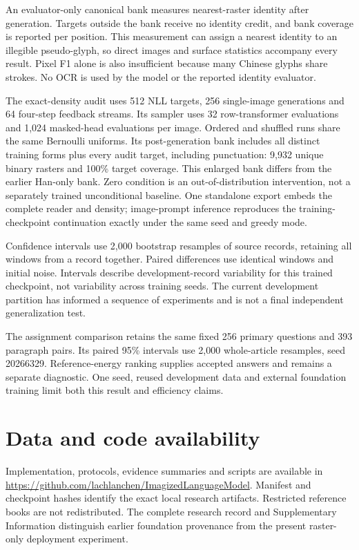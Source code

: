 An evaluator-only canonical bank measures nearest-raster identity after
generation. Targets outside the bank receive no identity credit, and bank
coverage is reported per position. This measurement can assign a nearest
identity to an illegible pseudo-glyph, so direct images and surface statistics
accompany every result. Pixel F1 alone is also insufficient because many
Chinese glyphs share strokes. No OCR is used by the model or the reported
identity evaluator.

The exact-density audit uses 512 NLL targets, 256 single-image generations and
64 four-step feedback streams. Its sampler uses 32 row-transformer evaluations
and 1,024 masked-head evaluations per image. Ordered and shuffled runs share
the same Bernoulli uniforms. Its post-generation bank includes all distinct
training forms plus every audit target, including punctuation: 9,932 unique
binary rasters and 100\% target coverage. This enlarged bank differs from the
earlier Han-only bank. Zero condition is an out-of-distribution intervention,
not a separately trained unconditional baseline. One standalone export embeds
the complete reader and density; image-prompt inference reproduces the
training-checkpoint continuation exactly under the same seed and greedy mode.

Confidence intervals use 2,000 bootstrap resamples of source records, retaining
all windows from a record together. Paired differences use identical windows
and initial noise. Intervals describe development-record variability for this
trained checkpoint, not variability across training seeds. The current
development partition has informed a sequence of experiments and is not a
final independent generalization test.

The assignment comparison retains the same fixed 256 primary questions and
393 paragraph pairs. Its paired 95\% intervals use 2,000 whole-article
resamples, seed 20266329. Reference-energy ranking supplies accepted answers
and remains a separate diagnostic. One seed, reused development data and
external foundation training limit both this result and efficiency claims.

\relax %
\section*{Data and code availability}
Implementation, protocols, evidence summaries and scripts are available in
\url{https://github.com/lachlanchen/ImagizedLanguageModel}. Manifest and
checkpoint hashes identify the exact local research artifacts. Restricted
reference books are not redistributed. The complete research record and
Supplementary Information distinguish earlier foundation provenance from the
present raster-only deployment experiment.



